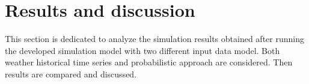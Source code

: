 \section{Results and discussion}
This section is dedicated to analyze the simulation results obtained after running the developed simulation model with two different input data model. Both weather historical time series and probabilistic approach are considered. Then results are compared and discussed.
